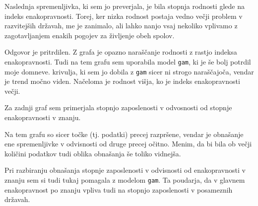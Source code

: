 \documentclass[11pt,a4paper]{article}
\begin{document}
Naslednja spremenljivka, ki sem jo preverjala, je bila stopnja rodnosti glede na indeks enakopravnosti. Torej, ker nizka rodnost postaja vedno večji problem v razvitejših državah, me je zanimalo, ali lahko nanjo vsaj nekoliko vplivamo z zagotavljanjem enakih pogojev za življenje obeh spolov.



Odgovor je pritrdilen. Z grafa je opazno naraščanje rodnosti z rastjo indeksa enakopravnosti. Tudi na tem grafu sem uporabila model \verb-gam-, ki je še bolj potrdil moje domneve. krivulja, ki sem jo dobila z \verb-gam- sicer ni strogo naraščajoča, vendar je trend močno viden. Načeloma je rodnost višja, ko je indeks enakopravnosti večji.

Za zadnji graf sem primerjala stopnjo zaposlenosti v odvosnosti od stopnje enakopravnosti v znanju. 



Na tem grafu so sicer točke (tj. podatki) precej razpršene, vendar je obnašanje ene spremenljivke v odvisnosti od druge precej očitno. Menim, da bi bila ob večji količini podatkov tudi oblika obnašanja še toliko vidnejša. 

Pri razbiranju obnašanja stopnje zaposlenosti v odvisnosti od enakopravnosti v znanju sem si tudi tukaj pomagala z modelom \verb-gam-. Ta poudarja, da v glavnem enakopravnost po znanju vpliva tudi na stopnjo zaposlenosti v posameznih državah.




\end{document}
